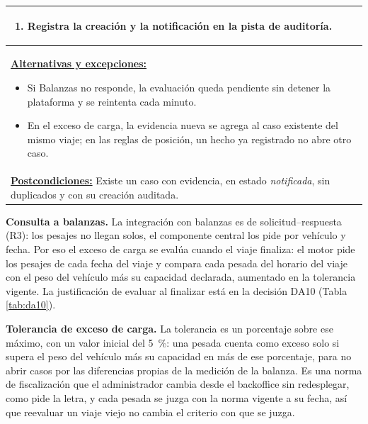 \begin{table}[H]
\begin{tabular}{|p{15.8cm}|}
\begin{enumerate}[leftmargin=*,topsep=2pt,itemsep=1pt,parsep=0pt,partopsep=0pt]
    \item Registra la creación y la notificación en la pista de auditoría.
\end{enumerate} \\ \hline
\textbf{\underline{Alternativas y excepciones:}}\par
\begin{itemize}[leftmargin=*,topsep=2pt,itemsep=1pt,parsep=0pt,partopsep=0pt]
    \item Si Balanzas no responde, la evaluación queda pendiente sin detener la plataforma y se reintenta cada minuto.
    \item En el exceso de carga, la evidencia nueva se agrega al caso existente del mismo viaje; en las reglas de posición, un hecho ya registrado no abre otro caso.
\end{itemize} \\ \hline
\textbf{\underline{Postcondiciones:}} Existe un caso con evidencia, en estado \emph{notificada}, sin duplicados y con su creación auditada. \\ \hline
\end{tabular}
\end{table}

\textbf{Consulta a balanzas.} La integración con balanzas es de solicitud--respuesta (R3): los pesajes no llegan solos, el componente central los pide por vehículo y fecha. Por eso el exceso de carga se evalúa cuando el viaje finaliza: el motor pide los pesajes de cada fecha del viaje y compara cada pesada del horario del viaje con el peso del vehículo más su capacidad declarada, aumentado en la tolerancia vigente. La justificación de evaluar al finalizar está en la decisión DA10 (Tabla \ref{tab:da10}).

\textbf{Tolerancia de exceso de carga.} La tolerancia es un porcentaje sobre ese máximo, con un valor inicial del 5~\%: una pesada cuenta como exceso solo si supera el peso del vehículo más su capacidad en más de ese porcentaje, para no abrir casos por las diferencias propias de la medición de la balanza. Es una norma de fiscalización que el administrador cambia desde el backoffice sin redesplegar, como pide la letra, y cada pesada se juzga con la norma vigente a su fecha, así que reevaluar un viaje viejo no cambia el criterio con que se juzga.

